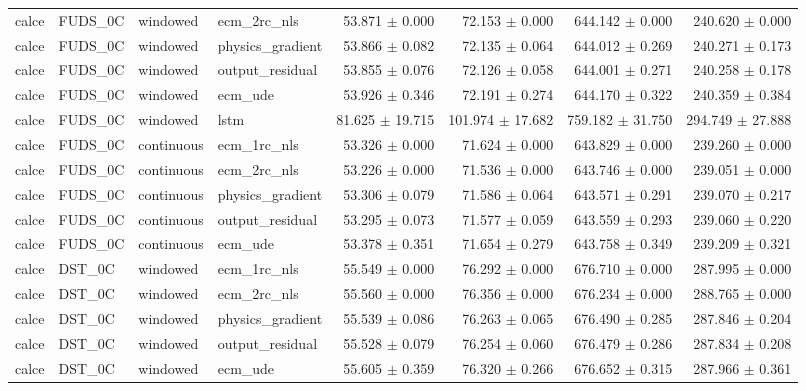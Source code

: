 \begin{longtable}{llllrrrr}
calce & FUDS\_0C & windowed & ecm\_2rc\_nls & 53.871 $\pm$ 0.000 & 72.153 $\pm$ 0.000 & 644.142 $\pm$ 0.000 & 240.620 $\pm$ 0.000 \\
calce & FUDS\_0C & windowed & physics\_gradient & 53.866 $\pm$ 0.082 & 72.135 $\pm$ 0.064 & 644.012 $\pm$ 0.269 & 240.271 $\pm$ 0.173 \\
calce & FUDS\_0C & windowed & output\_residual & 53.855 $\pm$ 0.076 & 72.126 $\pm$ 0.058 & 644.001 $\pm$ 0.271 & 240.258 $\pm$ 0.178 \\
calce & FUDS\_0C & windowed & ecm\_ude & 53.926 $\pm$ 0.346 & 72.191 $\pm$ 0.274 & 644.170 $\pm$ 0.322 & 240.359 $\pm$ 0.384 \\
calce & FUDS\_0C & windowed & lstm & 81.625 $\pm$ 19.715 & 101.974 $\pm$ 17.682 & 759.182 $\pm$ 31.750 & 294.749 $\pm$ 27.888 \\
calce & FUDS\_0C & continuous & ecm\_1rc\_nls & 53.326 $\pm$ 0.000 & 71.624 $\pm$ 0.000 & 643.829 $\pm$ 0.000 & 239.260 $\pm$ 0.000 \\
calce & FUDS\_0C & continuous & ecm\_2rc\_nls & 53.226 $\pm$ 0.000 & 71.536 $\pm$ 0.000 & 643.746 $\pm$ 0.000 & 239.051 $\pm$ 0.000 \\
calce & FUDS\_0C & continuous & physics\_gradient & 53.306 $\pm$ 0.079 & 71.586 $\pm$ 0.064 & 643.571 $\pm$ 0.291 & 239.070 $\pm$ 0.217 \\
calce & FUDS\_0C & continuous & output\_residual & 53.295 $\pm$ 0.073 & 71.577 $\pm$ 0.059 & 643.559 $\pm$ 0.293 & 239.060 $\pm$ 0.220 \\
calce & FUDS\_0C & continuous & ecm\_ude & 53.378 $\pm$ 0.351 & 71.654 $\pm$ 0.279 & 643.758 $\pm$ 0.349 & 239.209 $\pm$ 0.321 \\
calce & DST\_0C & windowed & ecm\_1rc\_nls & 55.549 $\pm$ 0.000 & 76.292 $\pm$ 0.000 & 676.710 $\pm$ 0.000 & 287.995 $\pm$ 0.000 \\
calce & DST\_0C & windowed & ecm\_2rc\_nls & 55.560 $\pm$ 0.000 & 76.356 $\pm$ 0.000 & 676.234 $\pm$ 0.000 & 288.765 $\pm$ 0.000 \\
calce & DST\_0C & windowed & physics\_gradient & 55.539 $\pm$ 0.086 & 76.263 $\pm$ 0.065 & 676.490 $\pm$ 0.285 & 287.846 $\pm$ 0.204 \\
calce & DST\_0C & windowed & output\_residual & 55.528 $\pm$ 0.079 & 76.254 $\pm$ 0.060 & 676.479 $\pm$ 0.286 & 287.834 $\pm$ 0.208 \\
calce & DST\_0C & windowed & ecm\_ude & 55.605 $\pm$ 0.359 & 76.320 $\pm$ 0.266 & 676.652 $\pm$ 0.315 & 287.966 $\pm$ 0.361 \\

\end{longtable}
